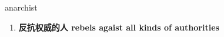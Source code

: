 
\begin{frame}
{\huge anarchist}
\begin{center}
\begin{enumerate}\Large
  \item \textbf{反抗权威的人 rebels agaist all kinds of authorities}
\end{enumerate}
\end{center}
\end{frame}
